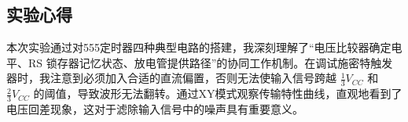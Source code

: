 ﻿\documentclass[10.5pt]{config}
\begin{document}
\subsection{实验心得}
本次实验通过对555定时器四种典型电路的搭建，我深刻理解了“电压比较器确定电平、RS 锁存器记忆状态、放电管提供路径”的协同工作机制。在调试施密特触发器时，我注意到必须加入合适的直流偏置，否则无法使输入信号跨越 $\frac{1}{3}V_{CC}$ 和 $\frac{2}{3}V_{CC}$ 的阈值，导致波形无法翻转。通过XY模式观察传输特性曲线，直观地看到了电压回差现象，这对于滤除输入信号中的噪声具有重要意义。
\end{document}
